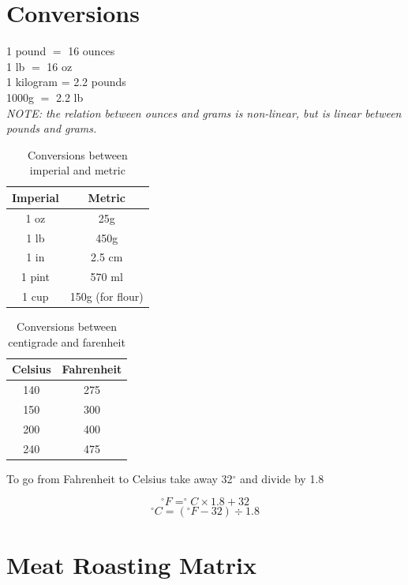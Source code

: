 \documentclass[18pt, oneside]{book}
\begin{document}
\begin{appendices}
\chapter{Conversions}
   
1 pound $=$ 16 ounces \\
1 lb $=$ 16 oz   \\

1 kilogram = 2.2 pounds \\
1000g $=$ 2.2 lb \\

\it{NOTE: the relation between ounces and grams is non-linear, but is linear between pounds and grams.} \normalfont \\
   
\begin{table}[h!]
 \centering
 \begin{tabular}{|c|c|}
\hline
Imperial & Metric \\
\hline
1 oz & 25g \\
1 lb & 450g \\
1 in & 2.5 cm \\
1 pint & 570 ml \\
1 cup & 150g (for flour)\\ 
\hline
\end{tabular}
 \caption{Conversions between imperial and metric}
 \end{table}
 
 \begin{table}[h!]
 \centering
 \begin{tabular}{|c|c|}
\hline
Celsius & Fahrenheit \\
\hline
140 & 275 \\
150 & 300 \\
200 & 400 \\
240 & 475 \\
\hline
\end{tabular}
 \caption{Conversions between centigrade and farenheit}
 \end{table}


To go from Fahrenheit to Celsius take away 32$^{\circ}$ and divide by 1.8 

\begin{equation}
  ^{\circ}F = ^{\circ}C \times 1.8 + 32
  \end{equation}
  \begin{equation}
  ^{\circ}C = (^{\circ}F - 32) \div 1.8
\end{equation}
\chapter{Meat Roasting Matrix}



\end{appendices}
\end{document}
